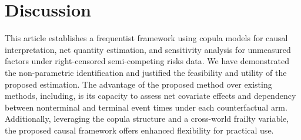 \documentclass[APA,Times1COL]{WileyNJDv5} %
\theoremstyle{plain}
\begin{document}

\section{Discussion}
\label{sec:conclusion}



This article establishes a frequentist framework using copula models for causal interpretation, net quantity estimation, and sensitivity analysis for unmeasured factors under right-censored semi-competing risks data. We have demonstrated the non-parametric identification and justified the feasibility and utility of the proposed estimation. 
{The advantage of the proposed method over existing methods, including\cite{Nevo2022semicompeting}, is its capacity to assess net covariate effects and dependency between nonterminal and terminal event times under each counterfactual arm. Additionally, leveraging the copula structure and a cross-world frailty variable, the proposed causal framework offers enhanced flexibility for practical use.}
\end{document}
